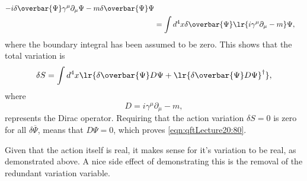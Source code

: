 {\begin{equation}
\begin{aligned}
{{      -i \delta \overbar{\Psi}
      \gamma^\mu
      \partial_\mu \Psi
   }
   -m \delta \overbar{\Psi} \Psi
} \\
&=
\int d^4 x \delta \overbar{\Psi} \lr{ i \gamma^\mu \partial_\mu - m } \Psi,
\end{aligned}
\end{equation}
where the boundary integral has been assumed to be zero.  This shows that the total variation is
\begin{equation}\label{eqn:qftLecture20:820}
\delta S
=
\int d^4 x
\lr{
\delta
   \overbar{\Psi} D \Psi
+
   \lr{
\delta
\overbar{\Psi} D \Psi }^\dagger
},
\end{equation}
where
\begin{equation}\label{eqn:qftLecture20:840}
D = i \gamma^\mu \partial_\mu - m,
\end{equation}
represents the Dirac operator.  Requiring that the action variation \( \delta S = 0 \) is zero for all \( \delta \overbar{\Psi} \), means that \( D \Psi = 0 \), which proves \cref{eqn:qftLecture20:80}.

Given that the action itself is real, it makes sense for it's variation to be real, as demonstrated above.  A nice side effect of demonstrating this is the removal of the redundant variation variable.
} %
